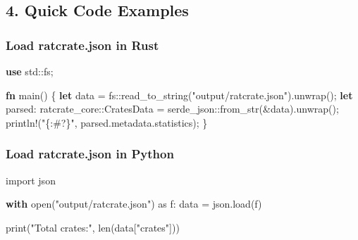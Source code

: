 \documentclass[
  letterpaper,
  DIV=11,
  numbers=noendperiod]{scrreprt}
\newenvironment{Shaded}{\begin{snugshade}}{\end{snugshade}}
\newcommand{\BuiltInTok}[1]{\textcolor[rgb]{0.00,0.23,0.31}{#1}}
\newcommand{\ControlFlowTok}[1]{\textcolor[rgb]{0.00,0.23,0.31}{\textbf{#1}}}
\newcommand{\ImportTok}[1]{\textcolor[rgb]{0.00,0.46,0.62}{#1}}
\newcommand{\KeywordTok}[1]{\textcolor[rgb]{0.00,0.23,0.31}{\textbf{#1}}}
\newcommand{\NormalTok}[1]{\textcolor[rgb]{0.00,0.23,0.31}{#1}}
\newcommand{\OperatorTok}[1]{\textcolor[rgb]{0.37,0.37,0.37}{#1}}
\newcommand{\PreprocessorTok}[1]{\textcolor[rgb]{0.68,0.00,0.00}{#1}}
\newcommand{\StringTok}[1]{\textcolor[rgb]{0.13,0.47,0.30}{#1}}
\begin{document}
\subsection{4. Quick Code Examples}\label{quick-code-examples}

\subsubsection{Load ratcrate.json in
Rust}\label{load-ratcrate.json-in-rust}

\begin{Shaded}
\begin{Highlighting}[]
\KeywordTok{use} \PreprocessorTok{std::}\NormalTok{fs}\OperatorTok{;}

\KeywordTok{fn}\NormalTok{ main() }\OperatorTok{\{}
    \KeywordTok{let}\NormalTok{ data }\OperatorTok{=} \PreprocessorTok{fs::}\NormalTok{read\_to\_string(}\StringTok{"output/ratcrate.json"}\NormalTok{)}\OperatorTok{.}\NormalTok{unwrap()}\OperatorTok{;}
    \KeywordTok{let}\NormalTok{ parsed}\OperatorTok{:} \PreprocessorTok{ratcrate\_core::}\NormalTok{CratesData }\OperatorTok{=} \PreprocessorTok{serde\_json::}\NormalTok{from\_str(}\OperatorTok{\&}\NormalTok{data)}\OperatorTok{.}\NormalTok{unwrap()}\OperatorTok{;}
    \PreprocessorTok{println!}\NormalTok{(}\StringTok{"\{:\#?\}"}\OperatorTok{,}\NormalTok{ parsed}\OperatorTok{.}\NormalTok{metadata}\OperatorTok{.}\NormalTok{statistics)}\OperatorTok{;}
\OperatorTok{\}}
\end{Highlighting}
\end{Shaded}

\subsubsection{Load ratcrate.json in
Python}\label{load-ratcrate.json-in-python}

\begin{Shaded}
\begin{Highlighting}[]
\ImportTok{import}\NormalTok{ json}

\ControlFlowTok{with} \BuiltInTok{open}\NormalTok{(}\StringTok{"output/ratcrate.json"}\NormalTok{) }\ImportTok{as}\NormalTok{ f:}
\NormalTok{    data }\OperatorTok{=}\NormalTok{ json.load(f)}

\BuiltInTok{print}\NormalTok{(}\StringTok{"Total crates:"}\NormalTok{, }\BuiltInTok{len}\NormalTok{(data[}\StringTok{"crates"}\NormalTok{]))}
\end{Highlighting}
\end{Shaded}
\end{document}
